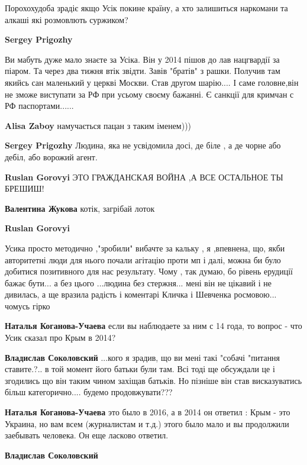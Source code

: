 \begin{itemize}
\begin{itemize}
Порохохудоба зрадіє якщо Усік покине країну, а хто залишиться наркомани та алкаші які розмовлють суржиком?

\textbf{Sergey Prigozhy} 

Ви мабуть дуже мало знаєте за Усіка. Він у 2014 пішов до лав нацгвардії за
піаром. Та через два тижня втік звідти. Завів "братів" з рашки. Получив там
якийсь сан маленький у церкві Москви. Став другом шарію.... І саме головне,він
не зможе виступати за РФ при усьому своєму бажанні. Є санкції для кримчан с РФ
паспортами......



\textbf{Alisa Zaboy} намучається пацан з таким іменем)))

\textbf{Sergey Prigozhy} Людина, яка не усвідомила досі, де біле , а де чорне або дебіл, або ворожий агент.

\textbf{Ruslan Gorovyi} ЭТО ГРАЖДАНСКАЯ ВОЙНА ,А ВСЕ ОСТАЛЬНОЕ ТЫ БРЕШИШ!


\textbf{Валентина Жукова} котік, загрібай лоток

\textbf{Ruslan Gorovyi} 

Усика просто методично ,"зробили" вибачте за кальку , я ,впевнена, що, якби
авторитетні люди для нього почали агітацію проти мп і далі, можна би було
добитися позитивного для нас результату. Чому , так думаю, бо рівень ерудиції
бажає бути... а без цього ...людина без стержня... мені він не цікавий і не
дивилась, а ще вразила радість і коментарі Кличка і Шевченка росмовою... чомусь
гірко

\textbf{Наталья Коганова-Учаева} если вы наблюдаете за ним с 14 года, то вопрос - что Усик сказал про Крым в 2014?

\textbf{Владислав Соколовский} ...кого я зрадив, що ви мені такі "собачі "питання ставите.?.. в той момент його батьки були там. Всі тоді ще обсуждали це і згодились що він таким чином захіщав батьків. Но пізніше він став висказуватись більш категорично.... будемо продовжувати???

\textbf{Наталья Коганова-Учаева} это было в 2016, а в 2014 он ответил : Крым - это Украина, но вам всем (журналистам и т.д.) этого было мало и вы продолжили заебывать человека. Он еще ласково ответил.

\textbf{Владислав Соколовский} 


\end{itemize}
\end{itemize}
